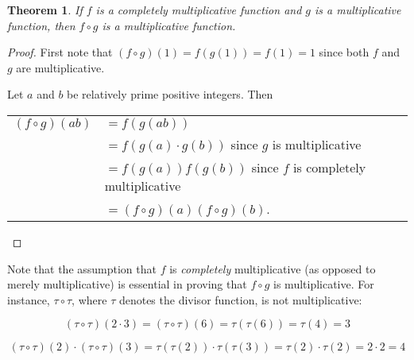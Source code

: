 \documentclass[12pt]{article}
\newtheorem*{thm*}{Theorem}
\begin{document}
\begin{thm*}
If $f$ is a completely multiplicative function and $g$ is a multiplicative function, then $f \circ g$ is a multiplicative function.
\end{thm*}

\begin{proof}
First note that $(f \circ g)(1)=f(g(1))=f(1)=1$ since both $f$ and $g$ are multiplicative.

Let $a$ and $b$ be relatively prime positive integers.  Then

\begin{center}
\begin{tabular}{ll}
$(f \circ g)(ab)$ & $=f(g(ab))$ \\
& $=f(g(a)\cdot g(b))$ since $g$ is multiplicative \\
& $=f(g(a))f(g(b))$ since $f$ is completely multiplicative \\
& $=(f \circ g)(a)(f \circ g)(b)$. \end{tabular}
\end{center}
\end{proof}

Note that the assumption that $f$ is \emph{completely} multiplicative (as opposed to merely multiplicative) is essential in proving that $f \circ g$ is multiplicative.  For instance, $\tau \circ \tau$, where $\tau$ denotes the divisor function, is not multiplicative:

$$(\tau \circ \tau)(2 \cdot 3)=(\tau \circ \tau)(6)=\tau(\tau(6))=\tau(4)=3$$

$$(\tau \circ \tau)(2) \cdot (\tau \circ \tau)(3)=\tau(\tau(2)) \cdot \tau(\tau(3))=\tau(2) \cdot \tau(2)=2\cdot 2=4$$
\end{document}
